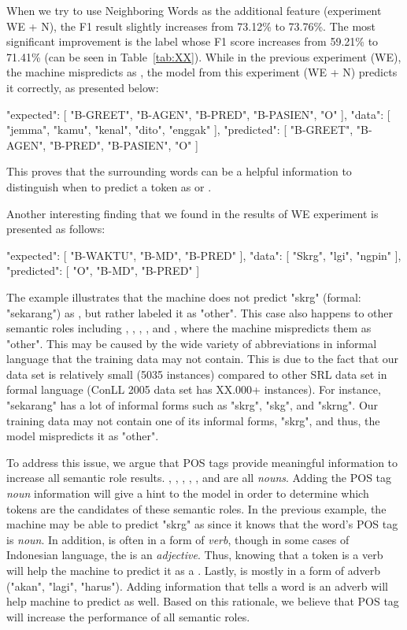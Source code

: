 When we try to use Neighboring Words as the additional feature (experiment WE + N), the F1 result slightly increases from 73.12\% to 73.76\%. The most significant improvement is the label \greet whose F1 score increases from 59.21\% to 71.41\% (can be seen in Table~\ref{tab:XX}). While in the previous experiment (WE), the machine mispredicts \greet as \agent, the model from this experiment (WE + N) predicts it correctly, as presented below:

  {
	"expected": [
	"B-GREET",
	"B-AGEN",
	"B-PRED",
	"B-PASIEN",
	"O"
	],
	"data": [
	"jemma",
	"kamu",
	"kenal",
	"dito",
	"enggak"
	],
	"predicted": [
	"B-GREET",
	"B-AGEN",
	"B-PRED",
	"B-PASIEN",
	"O"
	]

This proves that the surrounding words can be a helpful information to distinguish when to predict a token as \greet or \agent.

Another interesting finding that we found in the results of WE experiment is presented as follows:

{
	"expected": [
	"B-WAKTU",
	"B-MD",
	"B-PRED"
	],
	"data": [
	"Skrg",
	"lgi",
	"ngpin"
	],
	"predicted": [
	"O",
	"B-MD",
	"B-PRED"
	]

The example illustrates that the machine does not predict "skrg" (formal: "sekarang") as \timesrl, but rather labeled it as "other". This case also happens to other semantic roles including \agent, \patient, \beneficiary, \location, and \greet, where the machine mispredicts them as "other". This may be caused by the wide variety of abbreviations in informal language that the training data may not contain. This is due to the fact that our data set is relatively small (5035 instances) compared to other SRL data set in formal language (ConLL 2005 data set has XX.000+ instances). For instance, "sekarang" has a lot of informal forms such as "skrg", "skg", and "skrng". Our training data may not contain one of its informal forms, "skrg", and thus, the model mispredicts it as "other". 

To address this issue, we argue that POS tags provide meaningful information to increase all semantic role results. \agent, \patient, \beneficiary, \location, \greet, and \timesrl are all \textit{nouns}. Adding the POS tag \textit{noun} information will give a hint to the model in order to determine which tokens are the candidates of these semantic roles. In the previous example, the machine may be able to predict "skrg" as \timesrl since it knows that the word's POS tag is \textit{noun}. In addition, \predicate is often in a form of \textit{verb}, though in some cases of Indonesian language, the \predicate is an \textit{adjective}. Thus, knowing that a token is a verb will help the machine to predict it as a \predicate. Lastly, \modal is mostly in a form of adverb ("akan", "lagi", "harus"). Adding information that tells a word is an adverb will help machine to predict \modal as well. Based on this rationale, we believe that POS tag will increase the performance of all semantic roles.

}}
